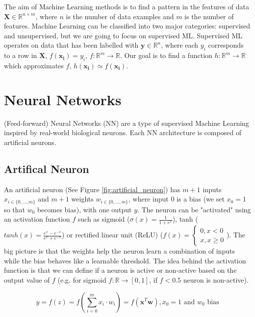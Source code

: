 The aim of Machine Learning methods is to find a pattern in the features of data $\boldsymbol{X} \in \mathbb{R}^{n \times m}$, where $n$ is the number of data examples and $m$ is the number of features. Machine Learning can be classified into two major categories: supervised and unsupervised, but we are going to focus on supervised ML. Supervised ML operates on data that has been labelled with $\boldsymbol{y} \in \mathbb{R}^{n}$, where each $y_i$ corresponds to a row in $\boldsymbol{X}$, $f(\boldsymbol{x_i}) = y_i$, $f \colon \mathbb{R}^m \xrightarrow{} \mathbb{R}$. Our goal is to find a function $h \colon \mathbb{R}^m \xrightarrow{} \mathbb{R}$ which approximates $f$, $h(\boldsymbol{x_i}) \simeq f(\boldsymbol{x_i})$.

\section{Neural Networks}
(Feed-forward) Neural Networks (NN) \cite{ml, Goodfellow-et-al-2016, russell2016artificial, lecun2015deep} are a type of supervised Machine Learning inspired by real-world biological neurons. Each NN architecture is composed of artificial neurons.

\subsection{Artifical Neuron}

An artificial neuron \cite{ml, russell2016artificial, Goodfellow-et-al-2016} (See Figure \ref{fig:artificial_neuron}) has $m + 1$ inputs $x_{i \in \{0, ..., m\}}$ and $m + 1$ weights $w_{i \in \{0, ..., m\}}$, where input $0$ is a bias (we set $x_0 = 1$ so that $w_0$ becomes bias), with one output $y$. The neuron can be "activated" using an activation function $f$ such as sigmoid ($\sigma(x) = \frac{1}{1 + e^x}$), tanh ($tanh(x) = \frac{e^x - e ^{-x}}{e^x + e ^{-x}}$) or rectified linear unit (ReLU) ($f(x) = \begin{cases} 0, x < 0 \\ x, x \geq 0 \end{cases}$). The big picture is that the weights help the neuron learn a combination of inputs while the bias behaves like a learnable threshold. The idea behind the activation function is that we can define if a neuron is active or non-active based on the output value of $f$ (e.g. for sigmoid $f\colon \mathbb{R} \xrightarrow{} [0, 1]$, if $f < 0.5$ neuron is non-active).

$$y = f(z) = f(\sum_{i = 0}^{m} x_i \cdot w_i) = f(\boldsymbol{x}^T \boldsymbol{w}), x_0 = 1 \text{ and } w_0 \text{ bias}$$

